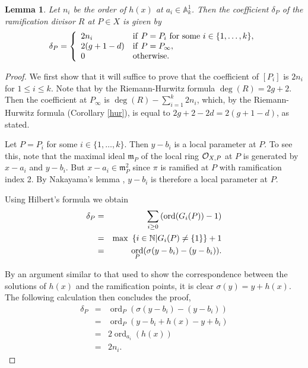 \documentclass[draft, 11pt]{article} %
\theoremstyle{plain}
\newtheorem{lem}[defn]{Lemma}
\theoremstyle{remark}
\newcommand{\cO}{{\cal O}}
\newcommand{\NN}{{\mathbb N}}
\DeclareMathOperator{\ord}{ord}
\begin{document}
\begin{lem}\label{char2ramification}
 Let $n_i$ be the order of $h(x)$ at $a_i\in \mathbb A_k^1$.
Then the coefficient $\delta_P$ of the ramification divisor $R$ at $P\in X$ is given by
\[
 \delta_P = \left\{
 \begin{array}{ll}
 2n_i & {\rm if }\ P=P_i\ {\rm for\ some }\ i \in \{1,\ldots ,k\}, \\
 2(g+1-d) & {\rm if }\  P=P_\infty, \\
 0 & {\rm otherwise.} 
 \end{array}
\right.
\]
\end{lem}
\begin{proof}
 We first show that it will suffice to prove that the coefficient of $[P_i]$ is $2n_i$ for $1\leq i \leq k$.
 Note that by the Riemann-Hurwitz formula $\deg(R) = 2g+2$.
 Then the coefficient at $P_\infty$ is $\deg(R) - \sum_{i=1}^k2n_i$, which, by the Riemann-Hurwitz formula (Corollary \ref{hur}), is equal to $2g+2-2d = 2(g+1-d)$, as stated.
 
 Let $P=P_i$ for some $i\in \{1,\ldots , k\}$.
 Then $y-b_i$ is a local parameter at $P$.
 To see this, note that the maximal ideal $\mathfrak m_{P}$ of the local ring $\cO_{X,P}$ at $P$ is generated by $x-a_i$ and $y-b_i$.
 But $x-a_i\in \mathfrak m_{P}^2$ since $\pi$ is ramified at $P$ with ramification index 2.
 By Nakayama's lemma \cite[Prop. 2.6]{atiyahmacdonald}, $y-b_i$ is therefore a local parameter at $P$.
 
 Using Hilbert's formula \cite[Prop 4, \S 1, Ch IV]{localfields} we obtain
 \begin{eqnarray*}
  \delta_P & = & \sum_{i\geq 0} \left(\ord(G_i(P))-1\right) \\
  & = & {\rm max\ }\left\{ i\in \NN | G_i(P)\neq \{1\}\right\} + 1 \\
  & = & \ord_{P}(\sigma(y-b_i) - (y-b_i)).
  \end{eqnarray*}
  
 By an argument similar to that used to show the correspondence between the solutions of $h(x)$ and the ramification points, it is clear $\sigma(y)=y+h(x)$.
 The following calculation then concludes the proof,
  \begin{eqnarray*}
  \delta_P & = & \ord_{P}(\sigma(y-b_i) - (y-b_i)) \\
  & = & \ord_{P}(y-b_i+h(x) - y + b_i) \\
  & = & 2\ord_{a_i}(h(x)) \\
  & = & 2n_i.
 \end{eqnarray*}
\end{proof}
\end{document}
